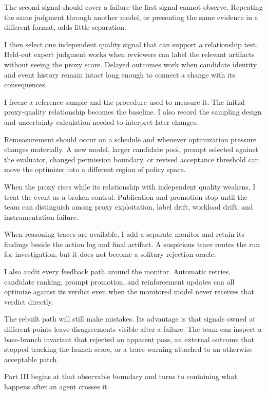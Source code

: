 The second signal should cover a failure the first signal cannot observe. Repeating the same judgment through another model, or presenting the same evidence in a different format, adds little separation.

I then select one independent quality signal that can support a relationship test. Held-out expert judgment works when reviewers can label the relevant artifacts without seeing the proxy score. Delayed outcomes work when candidate identity and event history remain intact long enough to connect a change with its consequences.

I freeze a reference sample and the procedure used to measure it. The initial proxy-quality relationship becomes the baseline. I also record the sampling design and uncertainty calculation needed to interpret later changes.

Remeasurement should occur on a schedule and whenever optimization pressure changes materially. A new model, larger candidate pool, prompt selected against the evaluator, changed permission boundary, or revised acceptance threshold can move the optimizer into a different region of policy space.

When the proxy rises while its relationship with independent quality weakens, I treat the event as a broken control. Publication and promotion stop until the team can distinguish among proxy exploitation, label drift, workload drift, and instrumentation failure.

When reasoning traces are available, I add a separate monitor and retain its findings beside the action log and final artifact. A suspicious trace routes the run for investigation, but it does not become a solitary rejection oracle.

I also audit every feedback path around the monitor. Automatic retries, candidate ranking, prompt promotion, and reinforcement updates can all optimize against its verdict even when the monitored model never receives that verdict directly.

The rebuilt path will still make mistakes. Its advantage is that signals owned at different points leave disagreements visible after a failure. The team can inspect a base-branch invariant that rejected an apparent pass, an external outcome that stopped tracking the launch score, or a trace warning attached to an otherwise acceptable patch.

Part III begins at that observable boundary and turns to containing what happens after an agent crosses it.

